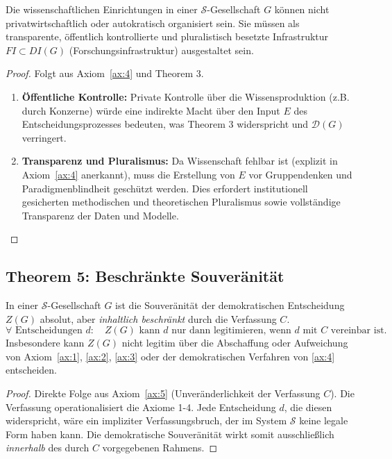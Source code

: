 \begin{theorem}
    Die wissenschaftlichen Einrichtungen in einer $\mathcal{S}$-Gesellschaft $G$ können nicht privatwirtschaftlich oder autokratisch organisiert sein. Sie müssen als transparente, öffentlich kontrollierte und pluralistisch besetzte Infrastruktur $\mathit{FI} \subset \mathit{DI}(G)$ (Forschungsinfrastruktur) ausgestaltet sein.
\end{theorem}

\begin{proof}
    Folgt aus Axiom~\ref{ax:4} und Theorem 3.
    \begin{enumerate}
        \item \textbf{Öffentliche Kontrolle:} Private Kontrolle über die Wissensproduktion (z.B. durch Konzerne) würde eine indirekte Macht über den Input $E$ des Entscheidungsprozesses bedeuten, was Theorem 3 widerspricht und $\mathcal{D}(G)$ verringert.
        \item \textbf{Transparenz und Pluralismus:} Da Wissenschaft fehlbar ist (explizit in Axiom~\ref{ax:4} anerkannt), muss die Erstellung von $E$ vor Gruppendenken und Paradigmenblindheit geschützt werden. Dies erfordert institutionell gesicherten methodischen und theoretischen Pluralismus sowie vollständige Transparenz der Daten und Modelle.
    \end{enumerate}
\end{proof}

\subsection{Theorem 5: Beschränkte Souveränität}

\begin{theorem}
    In einer $\mathcal{S}$-Gesellschaft $G$ ist die Souveränität der demokratischen Entscheidung $Z(G)$ absolut, aber \emph{inhaltlich beschränkt} durch die Verfassung $C$.
    \[
    \boxed{\forall \text{ Entscheidungen } d: \quad Z(G) \text{ kann } d \text{ nur dann legitimieren, wenn } d \text{ mit } C \text{ vereinbar ist}.}
    \]
    Insbesondere kann $Z(G)$ nicht legitim über die Abschaffung oder Aufweichung von Axiom~\ref{ax:1}, \ref{ax:2}, \ref{ax:3} oder der demokratischen Verfahren von \ref{ax:4} entscheiden.
\end{theorem}

\begin{proof}
    Direkte Folge aus Axiom~\ref{ax:5} (Unveränderlichkeit der Verfassung $C$). Die Verfassung operationalisiert die Axiome 1-4. Jede Entscheidung $d$, die diesen widerspricht, wäre ein impliziter Verfassungsbruch, der im System $\mathcal{S}$ keine legale Form haben kann. Die demokratische Souveränität wirkt somit ausschließlich \emph{innerhalb} des durch $C$ vorgegebenen Rahmens.
\end{proof}

